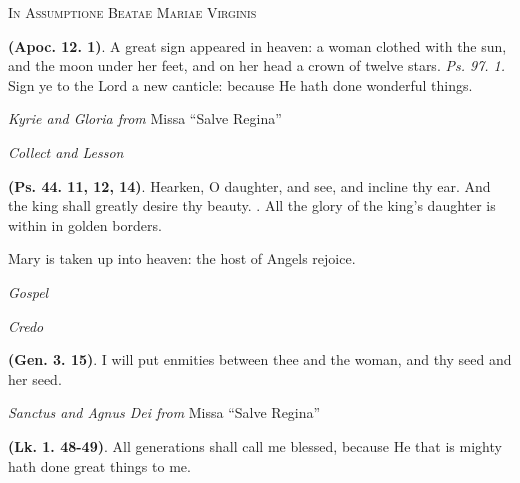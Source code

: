 \documentclass[11pt]{article} %
\begin{document}
\begin{center}\begin{huge}
  \textsc{In Assumptione Beatae Mariae Virginis}
\end{huge}\end{center}

\def\greinitialformat#1{%
  {\fontsize{34}{34}\selectfont #1}%
}

\textbf{(Apoc. 12. 1)}. A great sign appeared in heaven: a woman clothed with the sun, and the moon under her feet, and on her head a crown of twelve stars. \emph{Ps. 97. 1.} Sign ye to the Lord a new canticle: because He hath done wonderful things.

\vskip10pt

\emph{Kyrie and Gloria from} Missa ``Salve Regina''

\emph{Collect and Lesson}

\vskip10pt

\textbf{(Ps. 44. 11, 12, 14)}. Hearken, O daughter, and see, and incline thy ear. And the king shall greatly desire thy beauty. \Vbar{}. All the glory of the king's daughter is within in golden borders.

\vskip10pt

Mary is taken up into heaven: the host of Angels rejoice.

\vskip10pt

\emph{Gospel}

\emph{Credo}

\vskip10pt


\textbf{(Gen. 3. 15)}. I will put enmities between thee and the woman, and thy seed and her seed.

\vskip10pt

\emph{Sanctus and Agnus Dei from} Missa ``Salve Regina''

\vskip10pt


\textbf{(Lk. 1. 48-49)}. All generations shall call me blessed, because He that is mighty hath done great things to me.
\end{document}
